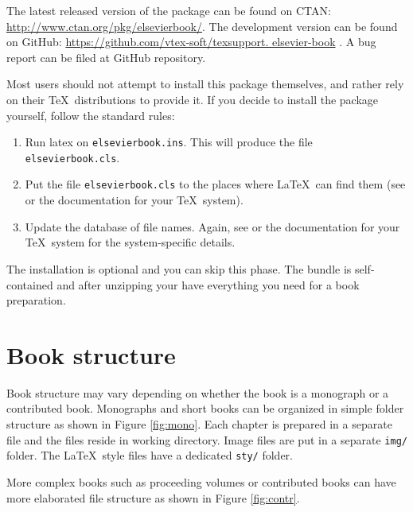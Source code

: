 \documentclass{ltxdoc}
\def\file#1{\texttt{#1}}
\begin{document}
The latest released version of the package can be found on CTAN: \linebreak
\url{http://www.ctan.org/pkg/elsevierbook/}. 
The development version can be found on GitHub: 
 \url{https://github.com/vtex-soft/texsupport. elsevier-book}%
. 
A bug report can be filed at GitHub repository. 

Most users should not attempt to install this package themselves, and rather rely on
their \TeX\ distributions to provide it. If you decide to install the package yourself, follow
the standard rules:
\begin{enumerate}
\item Run latex on \file{elsevierbook.ins}. This will produce the file \file{elsevierbook.cls}.
\item Put the file \file{elsevierbook.cls}  to the places where \LaTeX\ 
can find them (see \cite{ref:ukfaq} or the documentation for your \TeX\ system).
\item Update the database of file names. Again, see \cite{ref:ukfaq} or the documentation for your
\TeX\ system for the system-specific details.
\end{enumerate}


The installation is optional and you can skip this phase.
The bundle is self-contained and after unzipping your have everything you need for a book preparation. 


\section{Book structure}\label{bookstructure}

Book structure may vary depending on whether the book is a monograph or a contributed book. 
Monographs and short books can be organized in simple folder structure as shown in Figure 
\ref{fig:mono}.
Each chapter is prepared in a separate file and the files reside in working directory. 
Image files are put in a separate \file{img/} folder. 
The \LaTeX\ style files have a dedicated \file{sty/} folder.

More complex books such as proceeding volumes or contributed books can have more 
elaborated file structure as shown in Figure \ref{fig:contr}.
\end{document}
